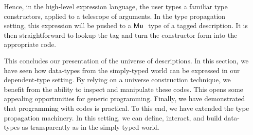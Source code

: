 Hence, in the high-level expression language, the user types a
familiar type constructors, applied to a telescope of arguments. In
the type propagation setting, this expression will be pushed to a
$\Mu{}$ type of a tagged description. It is then straightforward to
lookup the tag and turn the constructor form into the appropriate
code.

This concludes our presentation of the universe of descriptions. In
this section, we have seen how data-types from the simply-typed world
can be expressed in our dependent-type setting. By relying on a
universe construction technique, we benefit from the ability to
inspect and manipulate these codes. This opens some appealing
opportunities for generic programming. Finally, we have demonstrated
that programming with codes is practical. To this end, we have
extended the type propagation machinery. In this setting, we can
define, interact, and build data-types as transparently as in the
simply-typed world.
